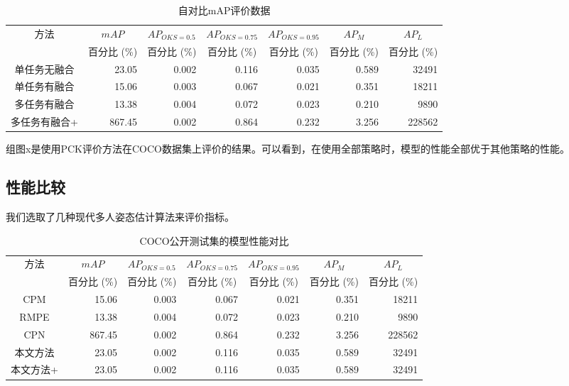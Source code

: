 \begin{longtable}[c]{c*{6}{r}}
	\caption{自对比mAP评价数据}
	\label{tab:mAPCOCOselfbenchmark}\\
	\toprule[1.5pt]
	方法 & \multicolumn{1}{c}{$mAP$} & \multicolumn{1}{c}{$AP_{OKS=0.5}$} & \multicolumn{1}{c}{$AP_{OKS=0.75}$} & \multicolumn{1}{c}{$AP_{OKS=0.95}$}
	& \multicolumn{1}{c}{$AP_M$} & \multicolumn{1}{c}{$AP_L$} \\
	
	& \multicolumn{1}{c}{百分比 (\%)}& \multicolumn{1}{c}{百分比 (\%)}&
	\multicolumn{1}{c}{百分比 (\%)}& \multicolumn{1}{c}{百分比 (\%)}& \multicolumn{1}{c}{
		百分比 (\%)}&  \multicolumn{1}{c}{
		百分比 (\%)}\\\midrule[1pt]
	\endhead
	\endlastfoot
	单任务无融合 & 23.05 & 0.002 & 0.116 & 0.035 & 0.589 & 32491 \\
	单任务有融合 & 15.06 & 0.003 & 0.067 & 0.021 & 0.351 & 18211 \\
	多任务有融合 & 13.38 & 0.004 & 0.072 & 0.023 & 0.210 & 9890 \\
	多任务有融合+ & 867.45 & 0.002 & 0.864 & 0.232 & 3.256 & 228562 \\
	\bottomrule[1.5pt]
\end{longtable}

组图x是使用PCK评价方法在COCO数据集上评价的结果。可以看到，在使用全部策略时，模型的性能全部优于其他策略的性能。

\subsection{性能比较}
\label{subsec:perf}
我们选取了几种现代多人姿态估计算法来评价指标。
\begin{longtable}[c]{c*{6}{r}}
	\caption{COCO公开测试集的模型性能对比}
	\label{tab:mAPCOCObenchmark}\\
	\toprule[1.5pt]
	方法 & \multicolumn{1}{c}{$mAP$} & \multicolumn{1}{c}{$AP_{OKS=0.5}$} & \multicolumn{1}{c}{$AP_{OKS=0.75}$} & \multicolumn{1}{c}{$AP_{OKS=0.95}$}
	& \multicolumn{1}{c}{$AP_M$} & \multicolumn{1}{c}{$AP_L$} \\
	
	& \multicolumn{1}{c}{百分比 (\%)}& \multicolumn{1}{c}{百分比 (\%)}&
	\multicolumn{1}{c}{百分比 (\%)}& \multicolumn{1}{c}{百分比 (\%)}& \multicolumn{1}{c}{
		百分比 (\%)}&  \multicolumn{1}{c}{
		百分比 (\%)}\\\midrule[1pt]
	\endhead
	\endlastfoot
	CPM\cite{wei2016convolutional} & 15.06 & 0.003 & 0.067 & 0.021 & 0.351 & 18211 \\
	RMPE\cite{fang2017rmpe} & 13.38 & 0.004 & 0.072 & 0.023 & 0.210 & 9890 \\
	CPN\cite{Chen2017Cascaded} & 867.45 & 0.002 & 0.864 & 0.232 & 3.256 & 228562 \\
	本文方法 & 23.05 & 0.002 & 0.116 & 0.035 & 0.589 & 32491 \\
	本文方法+ & 23.05 & 0.002 & 0.116 & 0.035 & 0.589 & 32491 \\
	\bottomrule[1.5pt]
\end{longtable}

